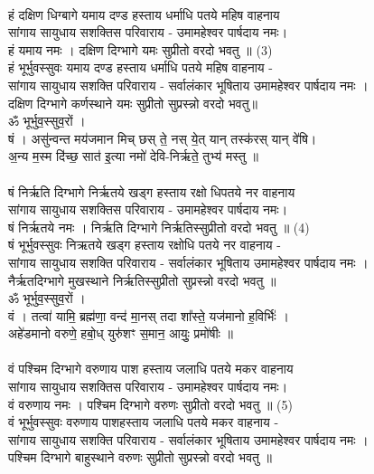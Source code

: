 \\
हं दक्षिण धिग्बागे यमाय दण्ड हस्ताय धर्माधि पतये महिष वाहनाय\\
सांगाय सायुधाय सशक्तिस परिवाराय -  उमामहेश्वर पार्षदाय नमः।\\
हं यमाय नमः । दक्षिण दिग्भागे यमः सुप्रीतो  वरदो भवतु ॥ (3)\\
{\small हं भूर्भुवस्सुवः यमाय दण्ड हस्ताय धर्माधि पतये महिष वाहनाय -\\
सांगाय सायुधाय सशक्ति परिवाराय - सर्वालंकार भूषिताय उमामहेश्वर पार्षदाय नमः ।\\
दक्षिण दिग्भागे कर्णस्थाने यमः सुप्रीतो सुप्रस्न्नो वरदो भवतु॥}\\
ॐ भूर्भुव॒स्सुव॒रों ।\\
षं । असु॑न्वन्त मय॑जमान मिच् छस् ते॒ नस् ये॒त् यान् तस्क॑रस् यान् वे॑षि।\\
अ॒न्य म॒स्म दि॑च्छ॒ सात॑ इ॒त्या नमो॑ देवि-निर्ऋते॒ तुभ्य॑ मस्तु ॥\\
\\
षं निर्ऋति दिग्भागे निर्ऋतये खड्ग हस्ताय रक्षो धिपतये नर वाहनाय\\
सांगाय सायुधाय सशक्तिस परिवाराय -  उमामहेश्वर पार्षदाय नमः।\\
षं निर्ऋतये नमः । निर्ऋति दिग्भागे निर्ऋतिस्सुप्रीतो वरदो भवतु ॥ (4)\\
{\small षं भूर्भुवस्सुवः निऋतये खड्ग हस्ताय रक्षोधि पतये नर वाहनाय -\\
सांगाय सायुधाय सशक्ति परिवाराय - सर्वालंकार भूषिताय उमामहेश्वर पार्षदाय नमः ।\\
नैर्ऋतदिग्भागे मुखस्थाने निर्ऋतिस्सुप्रीतो सुप्रस्न्नो वरदो भवतु ॥}\\
ॐ भूर्भुव॒स्सुव॒रों ।\\
वं । तत्वा॑ यामि॒ ब्रह्म॑णा॒ वन्द॑ मा॒नस् तदा शा᳚स्ते॒ यज॑मानो ह॒विर्भिः॑ ।\\
अहे॑डमानो वरुणे॒ हबो॒ध् युरु॑शꣳ स॒मान॒ आयुः॒ प्रमो॑षीः ॥\\
\\
वं पश्चिम दिग्भागे वरुणाय पाश हस्ताय जलाधि पतये मकर वाहनाय\\
सांगाय सायुधाय सशक्तिस परिवाराय -  उमामहेश्वर पार्षदाय नमः।\\
वं वरुणाय नमः । पश्चिम दिग्भागे वरुणः सुप्रीतो वरदो भवतु ॥ (5)\\
{\small वं भूर्भुवस्सुवः वरुणाय पाशहस्ताय जलाधि पतये मकर वाहनाय -\\
सांगाय सायुधाय सशक्ति परिवाराय - सर्वालंकार भूषिताय उमामहेश्वर पार्षदाय नमः ।\\
पश्चिम दिग्भागे बाहुस्थाने वरुणः सुप्रीतो सुप्रस्न्नो वरदो भवतु ॥}\\

